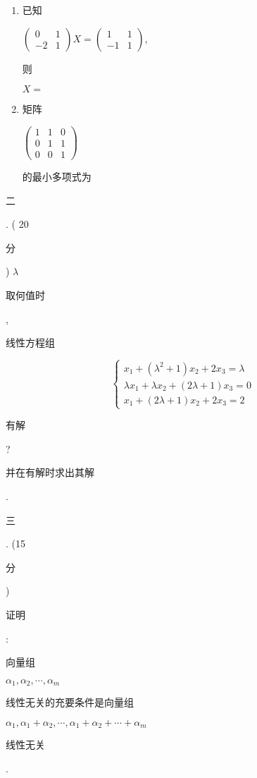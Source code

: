 \documentclass[10pt]{article}
\begin{document}
\begin{enumerate}
  \item \begin{CJK}{UTF8}{mj}已知\end{CJK} $\left(\begin{array}{cc}0 & 1 \\ -2 & 1\end{array}\right) X=\left(\begin{array}{cc}1 & 1 \\ -1 & 1\end{array}\right)$, \begin{CJK}{UTF8}{mj}则\end{CJK} $X=$

  \item \begin{CJK}{UTF8}{mj}矩阵\end{CJK} $\left(\begin{array}{ccc}1 & 1 & 0 \\ 0 & 1 & 1 \\ 0 & 0 & 1\end{array}\right)$ \begin{CJK}{UTF8}{mj}的最小多项式为\end{CJK}

\end{enumerate}
\begin{CJK}{UTF8}{mj}二\end{CJK}. ( 20 \begin{CJK}{UTF8}{mj}分\end{CJK}) $\lambda$ \begin{CJK}{UTF8}{mj}取何值时\end{CJK}, \begin{CJK}{UTF8}{mj}线性方程组\end{CJK}
$$
\left\{\begin{array}{l}
x_{1}+\left(\lambda^{2}+1\right) x_{2}+2 x_{3}=\lambda \\
\lambda x_{1}+\lambda x_{2}+(2 \lambda+1) x_{3}=0 \\
x_{1}+(2 \lambda+1) x_{2}+2 x_{3}=2
\end{array}\right.
$$
\begin{CJK}{UTF8}{mj}有解\end{CJK}? \begin{CJK}{UTF8}{mj}并在有解时求出其解\end{CJK}.

\begin{CJK}{UTF8}{mj}三\end{CJK}. (15 \begin{CJK}{UTF8}{mj}分\end{CJK}) \begin{CJK}{UTF8}{mj}证明\end{CJK}: \begin{CJK}{UTF8}{mj}向量组\end{CJK} $\alpha_{1}, \alpha_{2}, \cdots, \alpha_{m}$ \begin{CJK}{UTF8}{mj}线性无关的充要条件是向量组\end{CJK} $\alpha_{1}, \alpha_{1}+\alpha_{2}, \cdots, \alpha_{1}+\alpha_{2}+\cdots+\alpha_{m}$ \begin{CJK}{UTF8}{mj}线性无关\end{CJK}.
\end{document}
